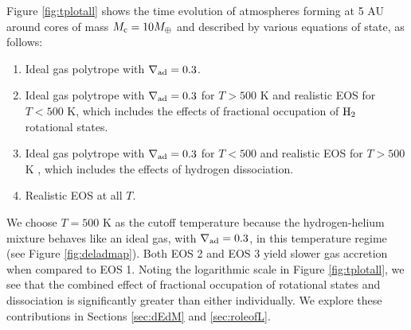 
Figure \ref{fig:tplotall} shows the time evolution of atmospheres forming at 5 AU around cores of mass $M_{\rm c}=10 M_{\oplus}$ and described by various equations of state, as follows:
\begin{enumerate}
\item Ideal gas polytrope with $\nabla_{\rm ad}=0.3$. %
\item Ideal gas polytrope with $\nabla_{\rm ad}=0.3$ for $T>500$ K and realistic EOS for $T<500$ K, which includes the effects of fractional occupation of $\rm H_2$ rotational states.
\item Ideal gas polytrope with $\nabla_{\rm ad}=0.3$ for $T<500$ and realistic EOS for $T>500$ K , which includes the effects of hydrogen dissociation.
\item Realistic EOS at all $T$. 
\end{enumerate}
We choose $T=500$ K as the cutoff temperature because the hydrogen-helium mixture behaves like an ideal gas, with $\nabla_{\rm ad}=0.3$, in this temperature regime (see Figure \ref{fig:deladmap}). 
Both EOS 2 and EOS 3 yield slower gas accretion when compared to EOS 1. Noting the logarithmic scale in Figure \ref{fig:tplotall}, we see that the combined effect of fractional occupation of rotational states and dissociation is significantly greater than either individually. We explore these contributions in Sections  \ref{sec:dEdM} and \ref{sec:roleofL}.

  
